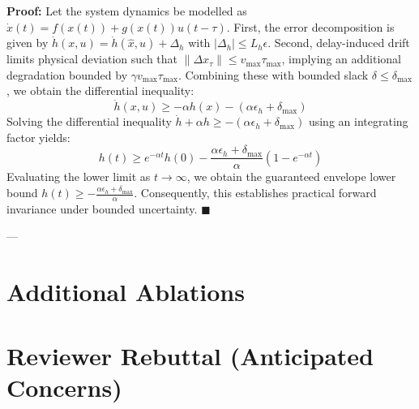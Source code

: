 \documentclass[10pt,twocolumn]{article}
\begin{document}
\textbf{Proof:}
Let the system dynamics be modelled as $\dot{x}(t) = f(x(t)) + g(x(t))u(t - \tau)$.
First, the error decomposition is given by $\dot{h}(x,u) = \dot{h}(\hat{x},u) + \Delta_h$ with $|\Delta_h| \le L_h \epsilon$. Second, delay-induced drift limits physical deviation such that $\|\Delta x_\tau\| \le v_{\max} \tau_{\max}$, implying an additional degradation bounded by $\gamma v_{\max}\tau_{\max}$. Combining these with bounded slack $\delta \le \delta_{\max}$, we obtain the differential inequality:
\begin{equation}
\dot{h}(x,u) \ge -\alpha h(x) - (\alpha\epsilon_h + \delta_{\max})
\end{equation}
Solving the differential inequality $\dot{h} + \alpha h \ge -(\alpha\epsilon_h + \delta_{\max})$ using an integrating factor yields:
\begin{equation}
h(t) \ge e^{-\alpha t} h(0) - \frac{\alpha\epsilon_h + \delta_{\max}}{\alpha}(1 - e^{-\alpha t})
\end{equation}
Evaluating the lower limit as $t \to \infty$, we obtain the guaranteed envelope lower bound $h(t) \ge -\frac{\alpha \epsilon_h + \delta_{\max}}{\alpha}$. Consequently, this establishes practical forward invariance under bounded uncertainty. $\blacksquare$

---

\section{Additional Ablations}

\begin{table}[ht]
\centering
\caption{Ablation study establishing the contribution of each component.}
\end{table}

\section{Reviewer Rebuttal (Anticipated Concerns)}
\end{document}

